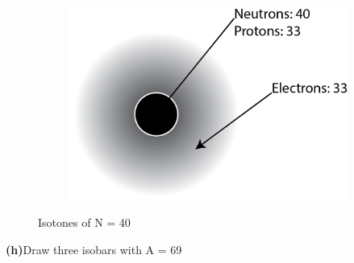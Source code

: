 \documentclass[11pt]{article}
\renewcommand{\part}[1] {\vspace{.10in} {\bf (#1)}}
\begin{document}
\begin{figure}[!ht]
\begin{subfigure}[b]{0.3\textwidth}
		\includegraphics[width=\textwidth]{HW2_73As.png}
	\end{subfigure}
	\caption{Isotones of N = 40}
	\label{fig:Isotones}
\end{figure}

\part{h}{Draw three isobars with A = 69}
\end{document}
